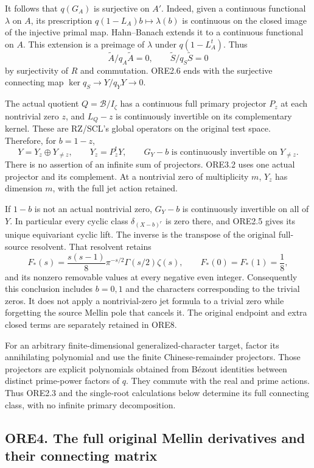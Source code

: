 It follows that \(q(G_A)\) is surjective on \(A'\). Indeed, given a
continuous functional \(\lambda\) on \(A\), its prescription
\(q(1-L_A)b\mapsto\lambda(b)\) is continuous on the closed image of the
injective primal map. Hahn--Banach extends it to a continuous functional
on \(A\). This extension is a preimage of \(\lambda\) under
\(q(1-L_A^t)\). Thus \[
\widetilde A/q_A\widetilde A=0,
\qquad
\widetilde S/q_S\widetilde S=0
\tag{ORE3.1}
\] by surjectivity of \(R\) and commutation. ORE2.6 ends with the
surjective connecting map \(\ker q_S\to Y/q_Y Y\to0\).

The actual quotient \(Q=\mathcal B/I_\zeta\) has a continuous full
primary projector \(P_z\) at each nontrivial zero \(z\), and \(L_Q-z\)
is continuously invertible on its complementary kernel. These are
RZ/SCL's global operators on the original test space. Therefore, for
\(b=1-z\), \[
Y=Y_z\oplus Y_{\ne z},\qquad
Y_z=P_z^tY,\qquad
G_Y-b\text{ is continuously invertible on }Y_{\ne z}.
\tag{ORE3.2}
\] There is no assertion of an infinite sum of projectors. ORE3.2 uses
one actual projector and its complement. At a nontrivial zero of
multiplicity \(m\), \(Y_z\) has dimension \(m\), with the full jet
action retained.

If \(1-b\) is not an actual nontrivial zero, \(G_Y-b\) is continuously
invertible on all of \(Y\). In particular every cyclic class
\(\delta_{(X-b)^r}\) is zero there, and ORE2.5 gives its unique
equivariant cyclic lift. The inverse is the transpose of the original
full-source resolvent. That resolvent retains \[
F_*(s)=\frac{s(s-1)}8\pi^{-s/2}\Gamma(s/2)\zeta(s),
\qquad F_*(0)=F_*(1)=\frac18,
\tag{ORE3.3}
\] and its nonzero removable values at every negative even integer.
Consequently this conclusion includes \(b=0,1\) and the characters
corresponding to the trivial zeros. It does not apply a nontrivial-zero
jet formula to a trivial zero while forgetting the source Mellin pole
that cancels it. The original endpoint and extra closed terms are
separately retained in ORE8.

For an arbitrary finite-dimensional generalized-character target, factor
its annihilating polynomial and use the finite Chinese-remainder
projectors. Those projectors are explicit polynomials obtained from
Bézout identities between distinct prime-power factors of \(q\). They
commute with the real and prime actions. Thus ORE2.3 and the single-root
calculations below determine its full connecting class, with no infinite
primary decomposition.

\subsection{ORE4. The full original Mellin derivatives and their
connecting
matrix}\label{ore4.-the-full-original-mellin-derivatives-and-their-connecting-matrix}

